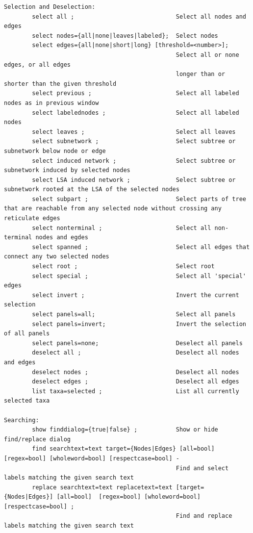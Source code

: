\documentclass[11pt]{article}
\begin{document}
\begin{verbatim}
Selection and Deselection:
        select all ;                             Select all nodes and edges
        select nodes={all|none|leaves|labeled};  Select nodes
        select edges={all|none|short|long} [threshold=<number>];
                                                 Select all or none edges, or all edges
                                                 longer than or shorter than the given threshold
        select previous ;                        Select all labeled nodes as in previous window
        select labelednodes ;                    Select all labeled nodes
        select leaves ;                          Select all leaves
        select subnetwork ;                      Select subtree or subnetwork below node or edge
        select induced network ;                 Select subtree or subnetwork induced by selected nodes
        select LSA induced network ;             Select subtree or subnetwork rooted at the LSA of the selected nodes
        select subpart ;                         Select parts of tree that are reachable from any selected node without crossing any reticulate edges 
        select nonterminal ;                     Select all non-terminal nodes and egdes
        select spanned ;                         Select all edges that connect any two selected nodes 
        select root ;                            Select root
        select special ;                         Select all 'special' edges
        select invert ;                          Invert the current selection
        select panels=all;                       Select all panels
        select panels=invert;                    Invert the selection of all panels
        select panels=none;                      Deselect all panels
        deselect all ;                           Deselect all nodes and edges
        deselect nodes ;                         Deselect all nodes
        deselect edges ;                         Deselect all edges
        list taxa=selected ;                     List all currently selected taxa     

Searching:
        show finddialog={true|false} ;           Show or hide find/replace dialog
        find searchtext=text target={Nodes|Edges} [all=bool] [regex=bool] [wholeword=bool] [respectcase=bool] -
                                                 Find and select labels matching the given search text
        replace searchtext=text replacetext=text [target={Nodes|Edges}] [all=bool]  [regex=bool] [wholeword=bool] [respectcase=bool] ; 
                                                 Find and replace labels matching the given search text


\end{verbatim}
\end{document}
